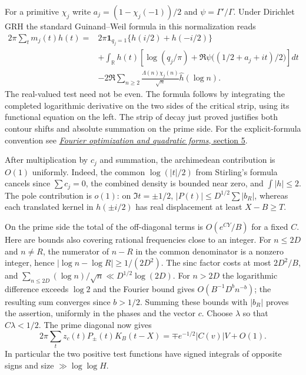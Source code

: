 For a primitive $\chi_j$ write $a_j=(1-\chi_j(-1))/2$ and
$\psi=\Gamma'/\Gamma$. Under Dirichlet GRH the standard Guinand--Weil
formula in this normalization reads
\begin{align*}
 2\pi\sum_t m_j(t)h(t)
   ={}& 2\pi\mathbf1_{q_j=1}\{h(i/2)+h(-i/2)\}\\
 &+\int_{\mathbb R}h(t)\left[\log(q_j/\pi)+
       \Re\psi\big((1/2+a_j+it)/2\big)\right]dt\\
 &-2\Re\sum_{n\ge2}\frac{\Lambda(n)\chi_j(n)}{\sqrt n}\widehat h(\log n).
\end{align*}
The real-valued test need not be even. The formula follows by integrating the
completed logarithmic derivative on the two sides of the critical strip,
using its functional equation on the left. The strip of decay just proved
justifies both contour shifts and absolute summation on the prime side.
For the explicit-formula convention see
\href{https://doi.org/10.1093/qmath/haab041}{\emph{Fourier optimization and quadratic forms}, section 5}.

After multiplication by $c_j$ and summation, the archimedean contribution
is $O(1)$ uniformly. Indeed, the common $\log(|t|/2)$ from Stirling's
formula cancels since $\sum c_j=0$, the combined density is bounded near
zero, and $\int |h|\le2$. The pole contribution is $o(1)$: on
$\Im t=\pm1/2$, $|P(t)|\le D^{1/2}\sum|b_R|$, whereas each translated kernel
in $h(\pm i/2)$ has real displacement at least $X-B\ge T$.

On the prime side the total of the off-diagonal terms is
$O(e^{C Y}/B)$ for a fixed $C$. Here are bounds also covering rational
frequencies close to an integer. For $n\le 2D$ and $n\ne R$, the numerator
of $n-R$ in the common denominator is a nonzero integer, hence
$|\log n-\log R|\ge 1/(2D^2)$. The sinc factor costs at most $2D^2/B$,
and $\sum_{n\le2D}(\log n)/\sqrt n\ll D^{1/2}\log(2D)$.
For $n>2D$ the logarithmic difference exceeds $\log2$ and the Fourier
bound gives $O(B^{-1}D^b n^{-b})$; the resulting sum converges since
$b>1/2$. Summing these bounds with $|b_R|$ proves the assertion, uniformly
in the phases and the vector $c$. Choose $\lambda$ so that $C\lambda<1/2$.
The prime diagonal now gives
\[
 2\pi\sum_t z_c(t)P_\pm(t)K_B(t-X)
    =\mp e^{-1/2}|C(v)|V+O(1).
\]
In particular the two positive test functions have signed integrals of
opposite signs and size $\gg\log\log H$.

